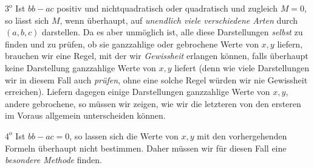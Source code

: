 $3^{\mathrm{o}}$ Ist $bb-ac$ positiv und nichtquadratisch oder quadratisch und zugleich $M=0$, so lässt sich $M$, wenn überhaupt, auf \textit{unendlich viele verschiedene Arten} durch $(a,b,c)$ darstellen. Da es aber unmöglich ist, alle diese Darstellungen \textit{selbst} zu finden und zu prüfen, ob sie ganzzahlige oder gebrochene Werte von $x,y$ liefern, brauchen wir eine Regel, mit der wir \textit{Gewissheit} erlangen können, falls überhaupt keine Darstellung ganzzahlige Werte von $x,y$ liefert (denn wie viele Darstellungen wir in diesem Fall auch \textit{prüfen}, ohne eine solche Regel würden wir nie Gewissheit erreichen). Liefern dagegen einige Darstellungen ganzzahlige Werte von $x,y$, andere gebrochene, so müssen wir zeigen, wie wir die letzteren von den ersteren im Voraus allgemein unterscheiden können.

$4^{\mathrm{o}}$ Ist $bb-ac=0$, so lassen sich die Werte von $x,y$ mit den vorhergehenden Formeln überhaupt nicht bestimmen. Daher müssen wir für diesen Fall eine \textit{besondere Methode} finden.

